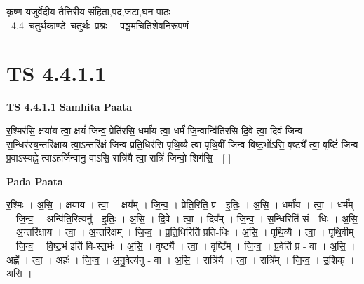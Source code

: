 \documentclass[17pt]{extarticle}
\begin{document}
\begin{titlepage}
    \begin{center}
 
\begin{sanskrit}
    { \Large
    कृष्ण यजुर्वेदीय तैत्तिरीय संहिता,पद,जटा,घन पाठः 
    }
    \\
    \vspace{2.5cm}
    \mbox{ \Large
    4.4      चतुर्थकाण्डे चतुर्थः प्रश्नः - पञ्चमचितिशेषनिरूपणं   }
\end{sanskrit}
\end{center}

\end{titlepage}
\tableofcontents
{}
\pagebreak


\section{ TS 4.4.1.1 }

\textbf{TS 4.4.1.1 } \newline
\textbf{Samhita Paata} \newline

र॒श्मिर॑सि॒ क्षया॑य त्वा॒ क्षयं॑ जिन्व॒ प्रेति॑रसि॒ धर्मा॑य त्वा॒ धर्मं॑ जि॒न्वान्वि॑तिरसि दि॒वे त्वा॒ दिवं॑ जिन्व स॒न्धिर॑स्य॒न्तरि॑क्षाय त्वा॒ऽन्तरि॑क्षं जिन्व प्रति॒धिर॑सि पृथि॒व्यै त्वा॑ पृथि॒वीं जि॑न्व विष्ट॒भों॑ऽसि॒ वृष्ट्यै᳚ त्वा॒ वृष्टिं॑ जिन्व प्र॒वाऽस्यह्ने॒ त्वाऽह॑र्जिन्वानु॒ वाऽसि॒ रात्रि॑यै त्वा॒ रात्रिं॑ जिन्वो॒ शिग॑सि॒ - [  ] \newline

\textbf{Pada Paata} \newline

र॒श्मिः । अ॒सि॒ । क्षया॑य । त्वा॒ । क्षय᳚म् । जि॒न्व॒ । प्रेति॒रिति॒ प्र - इ॒तिः॒ । अ॒सि॒ । धर्मा॑य । त्वा॒ । धर्म᳚म् । जि॒न्व॒ । अन्वि॑ति॒रित्यनु॑ - इ॒तिः॒ । अ॒सि॒ । दि॒वे । त्वा॒ । दिव᳚म् । जि॒न्व॒ । स॒न्धिरिति॑ सं - धिः । अ॒सि॒ । अ॒न्तरि॑क्षाय । त्वा॒ । अ॒न्तरि॑क्षम् । जि॒न्व॒ । प्र॒ति॒धिरिति॑ प्रति-धिः । अ॒सि॒ । पृ॒थि॒व्यै । त्वा॒ । पृ॒थि॒वीम् । जि॒न्व॒ । वि॒ष्ट॒भं इति॑ वि-स्त॒भंः । अ॒सि॒ । वृष्ट्यै᳚ । त्वा॒ । वृष्टि᳚म् । जि॒न्व॒ । प्र॒वेति॑ प्र - वा । अ॒सि॒ । अह्ने᳚ । त्वा॒ । अहः॑ । जि॒न्व॒ । अ॒नु॒वेत्य॑नु - वा । अ॒सि॒ । रात्रि॑यै । त्वा॒ । रात्रि᳚म् । जि॒न्व॒ । उ॒शिक् । अ॒सि॒ ।  \newline




\end{document}
